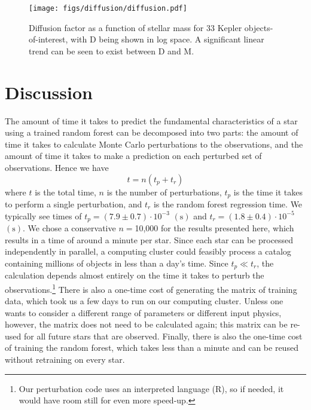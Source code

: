 \documentclass[iop,apj,twocolappendix]{emulateapj}
\begin{document}
\begin{figure}
    \centering
    \texttt{[image: figs/diffusion/diffusion.pdf]}
    \caption{Diffusion factor as a function of stellar mass for 33 Kepler objects-of-interest, with D being shown in log space. A significant linear trend can be seen to exist between D and M. \label{fig:diffusion} } 
\end{figure}

\section{Discussion}
The amount of time it takes to predict the fundamental characteristics of a star using a trained random forest can be decomposed into two parts: the amount of time it takes to calculate Monte Carlo perturbations to the observations, and the amount of time it takes to make a prediction on each perturbed set of observations. Hence we have
\begin{equation}
    t = n(t_p + t_r)
\end{equation}
where $t$ is the total time, $n$ is the number of perturbations, $t_p$ is the time it takes to perform a single perturbation, and $t_r$ is the random forest regression time. We typically see times of $t_p = (7.9 \pm 0.7) \cdot 10^{-3}$ $(\si{\s})$ and $t_r = (1.8 \pm 0.4) \cdot 10^{-5}$ $(\si{\s})$. We chose a conservative $n=$10,000 for the results presented here, which results in a time of around a minute per star. Since each star can be processed independently in parallel, a computing cluster could feasibly process a catalog containing millions of objects in less than a day's time. Since $t_p \ll t_r$, the calculation depends almost entirely on the time it takes to perturb the observations.\footnote{Our perturbation code uses an interpreted language (R), so if needed, it would have room still for even more speed-up.} There is also a one-time cost of generating the matrix of training data, which took us a few days to run on our computing cluster. Unless one wants to consider a different range of parameters or different input physics, however, the matrix does not need to be calculated again; this matrix can be re-used for all future stars that are observed. Finally, there is also the one-time cost of training the random forest, which takes less than a minute and can be reused without retraining on every star. 
\end{document}
